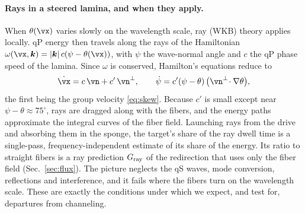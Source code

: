 \paragraph{Rays in a steered lamina, and when they apply.} When $\theta(\vx)$ varies slowly on the
wavelength scale, ray (WKB) theory applies locally. qP energy then travels along the rays of the
Hamiltonian $\omega(\vx,\bm k)=|\bm k|\,c(\psi-\theta(\vx))$, with $\psi$ the wave-normal angle and $c$
the qP phase speed of the lamina. Since $\omega$ is conserved, Hamilton's equations reduce to
\begin{equation}
\dot{\vx}=c\,\vn+c'\,\vn^\perp,\qquad \dot\psi=c'(\psi-\theta)\,\big(\vn^\perp\!\cdot\nabla\theta\big),
\label{eq:rays}
\end{equation}
the first being the group velocity \eqref{eq:skew}. Because $c'$ is small except near
$\psi-\theta\approx75^\circ$, rays are dragged along with the fibers, and the energy paths approximate
the integral curves of the fiber field. Launching rays from the drive and absorbing them in the sponge,
the target's share of the ray dwell time is a single-pass, frequency-independent estimate of its share
of the energy. Its ratio to straight fibers is a ray prediction $G_{\rm ray}$ of the redirection that
uses only the fiber field (Sec.~\ref{sec:flux}). The picture neglects the qS waves, mode conversion,
reflections and interference, and it fails where the fibers turn on the wavelength scale. These are
exactly the conditions under which we expect, and test for, departures from channeling.


